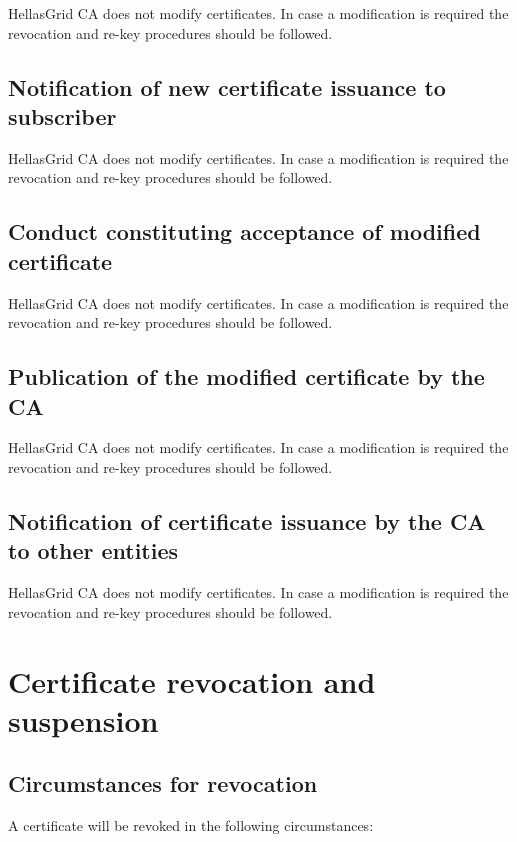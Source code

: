 HellasGrid CA does not modify certificates. In case a modification is required the revocation and re-key procedures should be followed. 

\subsection{Notification of new certificate issuance to subscriber}

HellasGrid CA does not modify certificates. In case a modification is required the revocation and re-key procedures should be followed. 

\subsection{Conduct constituting acceptance of modified certificate}

HellasGrid CA does not modify certificates. In case a modification is required the revocation and re-key procedures should be followed. 

\subsection{Publication of the modified certificate by the CA}

HellasGrid CA does not modify certificates. In case a modification is required the revocation and re-key procedures should be followed. 

\subsection{Notification of certificate issuance by the CA to other entities}

HellasGrid CA does not modify certificates. In case a modification is required the revocation and re-key procedures should be followed.

\section{Certificate revocation and suspension}
\subsection{Circumstances for revocation}

A certificate will be revoked in the following circumstances:

